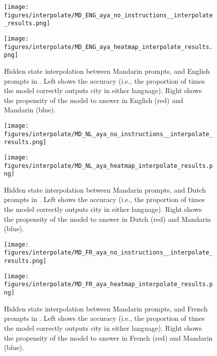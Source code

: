\begin{figure}[h]
\begin{minipage}{0.49\textwidth}
    \centering
    \texttt{[image: figures/interpolate/MD\_ENG\_aya\_no\_instructions\_\_interpolate\_results.png]} 
\end{minipage}
\begin{minipage}{0.49\textwidth}
    \centering
    \texttt{[image: figures/interpolate/MD\_ENG\_aya\_heatmap\_interpolate\_results.png]} 
\end{minipage}
\caption{Hidden state interpolation between Mandarin prompts, and English prompts in \aya. Left shows the accuracy (i.e., the proportion of times the model correctly outputs city in either language). Right shows the propensity of the model to answer in English (red) and Mandarin (blue). }
\end{figure}

\begin{figure}[h]
\begin{minipage}{0.49\textwidth}
    \centering
    \texttt{[image: figures/interpolate/MD\_NL\_aya\_no\_instructions\_\_interpolate\_results.png]} 
\end{minipage}
\begin{minipage}{0.49\textwidth}
    \centering
    \texttt{[image: figures/interpolate/MD\_NL\_aya\_heatmap\_interpolate\_results.png]} 
\end{minipage}
\caption{Hidden state interpolation between Mandarin prompts, and Dutch prompts in \aya. Left shows the accuracy (i.e., the proportion of times the model correctly outputs city in either language). Right shows the propensity of the model to answer in Dutch (red) and Mandarin (blue). }
\end{figure}

\begin{figure}[h]
\begin{minipage}{0.49\textwidth}
    \centering
    \texttt{[image: figures/interpolate/MD\_FR\_aya\_no\_instructions\_\_interpolate\_results.png]} 
\end{minipage}
\begin{minipage}{0.49\textwidth}
    \centering
    \texttt{[image: figures/interpolate/MD\_FR\_aya\_heatmap\_interpolate\_results.png]} 
\end{minipage}
\caption{Hidden state interpolation between Mandarin prompts, and French prompts in \aya. Left shows the accuracy (i.e., the proportion of times the model correctly outputs city in either language). Right shows the propensity of the model to answer in French (red) and Mandarin (blue). }
\end{figure}

